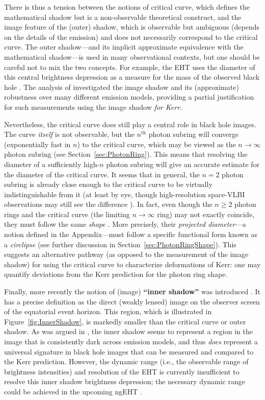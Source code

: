 \documentclass[graybox,envcountchap]{svmult}
\begin{document}
There is thus a tension between the notions of critical curve, which defines the mathematical shadow but is a non-observable theoretical construct, and the image feature of the (outer) shadow, which is observable but ambiguous (depends on the details of the emission) and does not necessarily correspond to the critical curve.
The outer shadow---and its implicit approximate equivalence with the mathematical shadow---is used in many observational contexts, but one should be careful not to mix the two concepts.
For example, the EHT uses the diameter of this central brightness depression as a measure for the mass of the observed black hole \cite{EHT2019VI}.
The analysis of \cite{Bronzwaer2021} investigated the image shadow and its (approximate) robustness over many different emission models, providing a partial justification for such measurements using the image shadow \emph{for Kerr}.

\bigskip

Nevertheless, the critical curve does still play a central role in black hole images.
The curve \emph{itself} is not observable, but the $n^\text{th}$ photon subring will converge (exponentially fast in $n$) to the critical curve, which may be viewed as the $n\to\infty$ photon subring (see Section~\ref{sec:PhotonRing}).
This means that resolving the diameter of a sufficiently high-$n$ photon subring will give an accurate estimate for the diameter of the critical curve.
It seems that in general, the $n=2$ photon subring is already close enough to the critical curve to be virtually indistinguishable from it (at least by eye, though high-resolution space-VLBI observations may still see the difference \cite{Paugnat2022}).
In fact, even though the $n\ge2$ photon rings and the critical curve (the limiting $n\to\infty$ ring) may not exactly coincide, they must follow the same \emph{shape} \cite{GLM2020,CardenasAvendano2023}.
More precisely, their \emph{projected diameter}---a notion defined in the Appendix---must follow a specific functional form known as a \emph{circlipse} (see further discussion in Section~\ref{sec:PhotonRingShape}).
This suggests an alternative pathway (as opposed to the measurement of the image shadow) for using the critical curve to characterize deformations of Kerr: one may quantify deviations from the Kerr prediction for the photon ring shape.

\bigskip

Finally, more recently the notion of (image) \textbf{``inner shadow''} was introduced \cite{Chael2021}.
It has a precise definition as the direct (weakly lensed) image on the observer screen of the equatorial event horizon.
This region, which is illustrated in Figure~\ref{fig:InnerShadow}, is markedly smaller than the critical curve or outer shadow.
As was argued in \cite{Chael2021}, the inner shadow seems to represent a region in the image that is consistently dark across emission models, and thus \emph{does} represent a universal signature in black hole images that can be measured and compared to the Kerr prediction.
However, the dynamic range (i.e., the observable range of brightness intensities) and resolution of the EHT is currently insufficient to resolve this inner shadow brightness depression; the necessary dynamic range could be achieved in the upcoming ngEHT \cite{Chael2021}.
\end{document}
